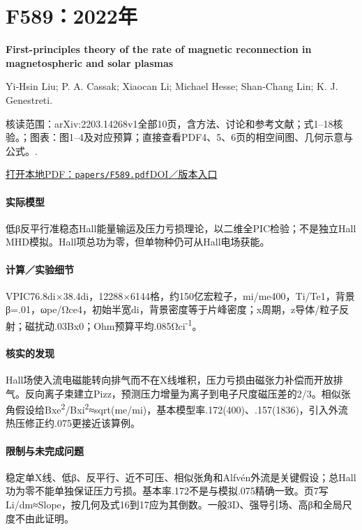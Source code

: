 \section{F589：2022年}\label{paper:F589}

\textbf{First-principles theory of the rate of magnetic reconnection in magnetospheric and solar plasmas}\citep{F589}\

Yi‐Hsin Liu;  P. A. Cassak;  Xiaocan Li;  Michael Hesse;  Shan‐Chang Lin;  K. J. Genestreti.

\textsf{核读范围：}arXiv:2203.14268v1全部10页，含方法、讨论和参考文献；式1–18核验。；\textsf{图表：}图1–4及对应预算；直接查看PDF4、5、6页的相空间图、几何示意与公式。.

\href{run:papers/F589.pdf}{打开本地PDF：\texttt{papers/F589.pdf}}\quad\href{https://doi.org/10.1038/s42005-022-00854-x}{DOI／版本入口}

\paragraph{实际模型}低β反平行准稳态Hall能量输运及压力亏损理论，以二维全PIC检验；不是独立Hall MHD模拟。Hall项总功为零，但单物种仍可从Hall电场获能。

\paragraph{计算／实验细节}VPIC76.8di×38.4di，12288×6144格，约150亿宏粒子，mi/me400，Ti/Te1，背景β=.01，ωpe/Ωce4，初始半宽di，背景密度等于片峰密度；x周期，z导体/粒子反射；磁扰动.03Bx0；Ohm预算平均.085Ωci\textsuperscript{-1}。

\paragraph{核实的发现}Hall场使入流电磁能转向排气而不在X线堆积，压力亏损由磁张力补偿而开放排气。反向离子束建立Pizz，预测压力增量为离子到电子尺度磁压差的2/3。相似张角假设给Bxe\textsuperscript{2}/Bxi\textsuperscript{2}≈sqrt(me/mi)，基本模型率.172(400)、.157(1836)，引入外流热压修正约.075更接近该算例。

\paragraph{限制与未完成问题}稳定单X线、低β、反平行、近不可压、相似张角和Alfvén外流是关键假设；总Hall功为零不能单独保证压力亏损。基本率.172不是与模拟.075精确一致。页7写Li/dm≈Slope，按几何及式16到17应为其倒数。一般3D、强导引场、高β和全局尺度不由此证明。

